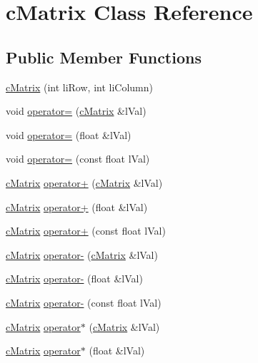 \hypertarget{classc_matrix}{
\section{cMatrix Class Reference}
\label{classc_matrix}
}
\subsection*{Public Member Functions}
\begin{DoxyCompactItemize}
\item 
\hyperlink{classc_matrix_a18b73c2c747b236d7ef9989acff7707a}{cMatrix} (int liRow, int liColumn)
\item 
void \hyperlink{classc_matrix_acb12737adff602163dffa098bf058105}{operator=} (\hyperlink{classc_matrix}{cMatrix} \&lVal)
\item 
void \hyperlink{classc_matrix_ac06926bba31e746c6946134cff767af3}{operator=} (float \&lVal)
\item 
void \hyperlink{classc_matrix_a9485d541a419175e8ea51b560eb910f1}{operator=} (const float lVal)
\item 
\hyperlink{classc_matrix}{cMatrix} \hyperlink{classc_matrix_ab72b22c4bed1e7acd694c1ce41756b47}{operator+} (\hyperlink{classc_matrix}{cMatrix} \&lVal)
\item 
\hyperlink{classc_matrix}{cMatrix} \hyperlink{classc_matrix_ad3a5d24417f057a1a900b5e78805c667}{operator+} (float \&lVal)
\item 
\hyperlink{classc_matrix}{cMatrix} \hyperlink{classc_matrix_a6848e16c55348f21244f4cda475e6c2b}{operator+} (const float lVal)
\item 
\hyperlink{classc_matrix}{cMatrix} \hyperlink{classc_matrix_a3db7778797b0bfafbc9f78c09b4114ee}{operator-\/} (\hyperlink{classc_matrix}{cMatrix} \&lVal)
\item 
\hyperlink{classc_matrix}{cMatrix} \hyperlink{classc_matrix_aec09028dd9d5de25967591ec9c538923}{operator-\/} (float \&lVal)
\item 
\hyperlink{classc_matrix}{cMatrix} \hyperlink{classc_matrix_a262976420f90ece91efbeb5bc7c9fd3b}{operator-\/} (const float lVal)
\item 
\hyperlink{classc_matrix}{cMatrix} \hyperlink{classc_matrix_a89176c84a903f423a4e309cb5c595a88}{operator$\ast$} (\hyperlink{classc_matrix}{cMatrix} \&lVal)
\item 
\hyperlink{classc_matrix}{cMatrix} \hyperlink{classc_matrix_afbb19919bf9bc2e9ed3ec907fe372cf2}{operator$\ast$} (float \&lVal)
\item 

\end{DoxyCompactItemize}

